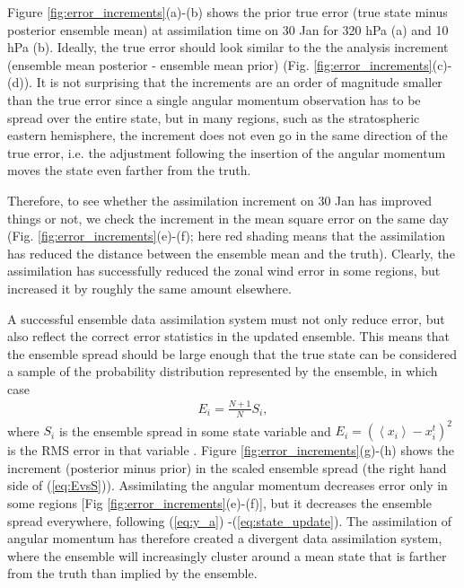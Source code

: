 Figure \ref{fig:error_increments}(a)-(b) shows the prior true error (true state minus posterior ensemble mean) at assimilation time on 30 Jan for 320 hPa (a) and 10 hPa (b).
Ideally, the true error should look similar to the the analysis increment (ensemble mean posterior - ensemble mean prior) (Fig. \ref{fig:error_increments}(c)-(d)).
It is not surprising that the increments are an order of magnitude smaller than the true error 
since a single angular momentum observation has to be spread over the entire state,
but in many regions, such as the stratospheric eastern hemisphere, the increment does not even go in the same direction of the true error, i.e. the adjustment following the insertion of the angular momentum moves the state even farther from the truth. 

Therefore, to see whether the assimilation increment on 30 Jan has improved things or not, we check the increment in the mean square error on the same day (Fig. \ref{fig:error_increments}(e)-(f);
here red shading means that the assimilation has reduced the distance between the ensemble mean and the truth).
Clearly, the assimilation has successfully reduced the zonal wind error in some regions, but increased it by roughly the same amount elsewhere.

A successful ensemble data assimilation system must not only reduce error, 
but also reflect the correct error statistics in the updated ensemble.
This means that the ensemble spread should be large 
enough that the true state can be considered  a sample of the probability 
distribution represented by the ensemble, in which case 
 \begin{eqnarray}
	 E_i = \frac{N+1}{N} S_i, 
	 \label{eq:EvsS}
 \end{eqnarray}
where $S_i$ is the ensemble spread in some state variable and $E_i=\left(\left< x_i \right>-x_{i}^{t}\right)^2$ is the RMS error in that variable \citep{Huntley2009, Murphy1988}.  
Figure \ref{fig:error_increments}(g)-(h) shows the increment (posterior minus prior) in the scaled ensemble spread (the right hand side of (\ref{eq:EvsS})).
Assimilating the angular momentum decreases error only in some regions [Fig \ref{fig:error_increments}(e)-(f)], but it decreases the ensemble spread everywhere, 
following (\ref{eq:y_a}) -(\ref{eq:state_update}).  
The assimilation of angular momentum has therefore created 
a divergent data assimilation system, where the ensemble will increasingly cluster around a mean state that is farther from the truth than implied by the ensemble. 


